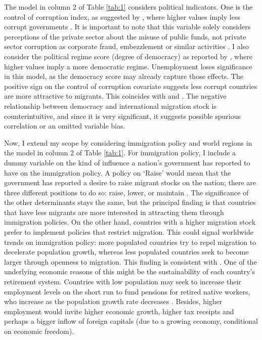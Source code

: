 \documentclass[../main.tex]{subfiles}
\begin{document}
The model in column 2 of Table \ref{tab:1} considers political indicators. One is the control of corruption index, as suggested by \textcite{Prada.2020}, where higher values imply less corrupt governments \parencite{Kaufmann.September2010}. It is important to note that this variable solely considers perceptions of the private sector about the misuse of public funds, not private sector corruption as corporate fraud, embezzlement or similar activities \parencite{Kaufmann.September2010}. I also consider the political regime score (degree of democracy) as reported by \textcite{OurWorldInData.2015}, where higher values imply a more democratic regime.  Unemployment loses significance in this model, as the democracy score may already capture those effects. The positive sign on the control of corruption covariate suggests less corrupt countries are more attractive to migrants. This coincides with \textcite{Dimant.2013} and \textcite{Azad.2020}. The negative relationship between democracy and international migration stock is counterintuitive, and since it is very significant, it suggests possible spurious correlation or an omitted variable bias.

Now, I extend my scope by considering immigration policy and world regions in the model in column 2 of Table \ref{tab:1}. For immigration policy, I include a dummy variable on the kind of influence a nation’s government has reported to have on the immigration policy. A policy on ‘Raise’ would mean that the government has reported a desire to raise migrant stocks on the nation; there are three different positions to do so: raise, lower, or maintain \parencite{UnitedNations.2017}. The significance of the other determinants stays the same, but the principal finding is that countries that have less migrants are more interested in attracting them through immigration policies.  On the other hand, countries with a higher migration stock prefer to implement policies that restrict migration. This could signal worldwide trends on immigration policy: more populated countries try to repel migration to decelerate population growth, whereas less populated countries seek to become larger through openness to migration. This finding is consistent with \textcite{Wesselbaum.2018}. One of the underlying economic reasons of this might be the sustainability of each country’s retirement system. Countries with low population may seek to increase their employment levels on the short run to fund pensions for retired native workers, who increase as the population growth rate decreases \parencite{Abel.2014}. Besides, higher employment would invite higher economic growth, higher tax receipts and perhaps a bigger inflow of foreign capitals (due to a growing economy, conditional on economic freedom). 
\end{document}
